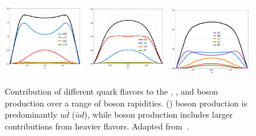 \begin{figure}[htbp]
\centering
\includegraphics[width=0.32\textwidth]{plots/SM/y_Wp.PNG}
\includegraphics[width=0.32\textwidth]{plots/SM/y_Wm.PNG}
\includegraphics[width=0.32\textwidth]{plots/SM/y_Z.PNG}
\caption{Contribution of different quark flavors to the \Wp, \Wm, and \Z boson production over a range of boson rapidities. \Wp (\Wm) boson production is predominantly $u\bar{d}$ ($\bar{u}d$), while \Z boson production includes larger contributions from heavier flavors. Adapted from~\cite{rapidity_boson}.}
\label{fig:wz_rapidity}
\end{figure}